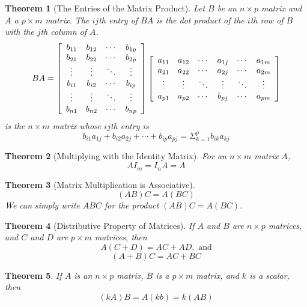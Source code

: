 \documentclass[10pt]{report}
\newtheorem{thm2}{Theorem}[section]
\begin{document}
\begin{thm2}[The Entries of the Matrix Product]
Let $B$ be an $n\times p$ matrix and $A$ a $p\times m$ matrix. The $ij$th entry of $BA$ is the dot product of the $i$th row of $B$ with the $j$th column of $A$.
$$BA = \left[ \begin{array}{c c c c}
b_{11} & b_{12} & \cdots & b_{1p}\\
b_{21} & b_{22} & \cdots & b_{2p}\\
\vdots & \vdots & \ddots & \vdots\\
b_{i1} & b_{i2} & \cdots & b_{ip}\\
\vdots & \vdots & \ddots & \vdots\\
b_{n1} & b_{n2} & \cdots & b_{np}
\end{array}\right]\left[ \begin{array}{c c c c c c}
a_{11} & a_{12} & \cdots & a_{1j} & \cdots & a_{1m}\\
a_{21} & a_{22} & \cdots & a_{2j} & \cdots & a_{2m}\\
\vdots & \vdots & \ddots & \vdots & \ddots & \vdots\\
a_{p1} & a_{p2} & \cdots & b_{pj} & \cdots & a_{pm}
\end{array}\right]$$
is the $n\times m$ matrix whose $ij$th entry is
$$b_{i1}a_{1j} + b_{i2}a_{2j} + \cdots + b_{ip}a_{pj} = \Sigma_{k=1}^p b_{ik}a_{kj}$$
\end{thm2}
\begin{thm2}[Multiplying with the Identity Matrix]
For an $n\times m$ matrix $A$,
$$AI_m = I_nA = A$$
\end{thm2}
\begin{thm2}[Matrix Multiplication is Associative]
$$(AB)C = A(BC)$$
We can simply write $ABC$ for the product $(AB)C = A(BC)$.
\end{thm2}
\begin{thm2}[Distributive Property of Matrices]
If $A$ and $B$ are $n\times p$ matrices, and $C$ and $D$ are $p\times m$ matrices, then 
$$A(C+D) = AC + AD, \text{ and}$$
$$(A+B)C = AC + BC$$
\end{thm2}
\begin{thm2}
If $A$ is an $n\times p$ matrix, $B$ is a $p\times m$ matrix, and $k$ is a scalar, then
$$(kA)B = A(kb) = k(AB)$$
\end{thm2}
\end{document}
